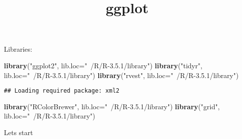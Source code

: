 \documentclass[]{article}
\title{ggplot}
\author{}
\date{}
\newenvironment{Shaded}{\begin{snugshade}}{\end{snugshade}}
\newcommand{\KeywordTok}[1]{\textcolor[rgb]{0.13,0.29,0.53}{\textbf{#1}}}
\newcommand{\DataTypeTok}[1]{\textcolor[rgb]{0.13,0.29,0.53}{#1}}
\newcommand{\DecValTok}[1]{\textcolor[rgb]{0.00,0.00,0.81}{#1}}
\newcommand{\StringTok}[1]{\textcolor[rgb]{0.31,0.60,0.02}{#1}}
\newcommand{\CommentTok}[1]{\textcolor[rgb]{0.56,0.35,0.01}{\textit{#1}}}
\newcommand{\OperatorTok}[1]{\textcolor[rgb]{0.81,0.36,0.00}{\textbf{#1}}}
\newcommand{\NormalTok}[1]{#1}
\begin{document}
\maketitle

Libraries:

\begin{Shaded}
\begin{Highlighting}[]
\KeywordTok{library}\NormalTok{(}\StringTok{"ggplot2"}\NormalTok{, }\DataTypeTok{lib.loc=}\StringTok{"~/R/R-3.5.1/library"}\NormalTok{)}
\KeywordTok{library}\NormalTok{(}\StringTok{"tidyr"}\NormalTok{, }\DataTypeTok{lib.loc=}\StringTok{"~/R/R-3.5.1/library"}\NormalTok{)}
\KeywordTok{library}\NormalTok{(}\StringTok{"rvest"}\NormalTok{, }\DataTypeTok{lib.loc=}\StringTok{"~/R/R-3.5.1/library"}\NormalTok{)}
\end{Highlighting}
\end{Shaded}

\begin{verbatim}
## Loading required package: xml2
\end{verbatim}

\begin{Shaded}
\begin{Highlighting}[]
\KeywordTok{library}\NormalTok{(}\StringTok{"RColorBrewer"}\NormalTok{, }\DataTypeTok{lib.loc=}\StringTok{"~/R/R-3.5.1/library"}\NormalTok{)}
\KeywordTok{library}\NormalTok{(}\StringTok{"grid"}\NormalTok{, }\DataTypeTok{lib.loc=}\StringTok{"~/R/R-3.5.1/library"}\NormalTok{)}
\end{Highlighting}
\end{Shaded}

Lets start

\begin{Shaded}
\end{Shaded}
\end{document}

